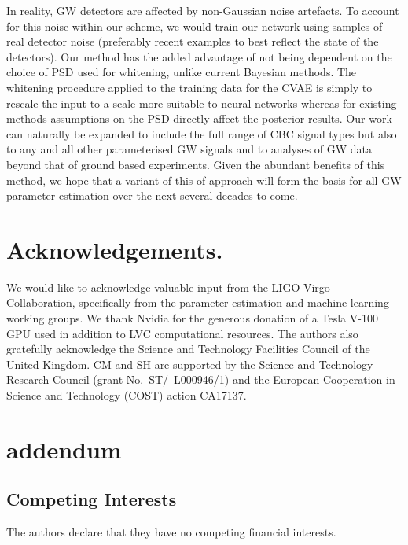 \documentclass[%
showpacs,
 amsmath,amssymb,
 aps,
 twocolumn,
 prl,
 reprint,
floatfix,
]{revtex4-1}
\begin{document}
%
%
In reality, \ac{GW} detectors are affected by non-Gaussian noise artefacts. To
account for this noise within our scheme, we would train our network using
samples of real detector noise (preferably recent examples to best reflect the
state of the detectors). Our method has the added advantage of not being
dependent on the choice of \ac{PSD} used for whitening, unlike current Bayesian
methods. The whitening procedure applied to the training data for the \ac{CVAE}
is simply to rescale the input to a scale more suitable to neural networks
whereas for existing methods assumptions on the \ac{PSD} directly affect the
posterior results. Our work can naturally be expanded to include the full range
of \ac{CBC} signal types but also to any and all other parameterised \ac{GW}
signals and to analyses of \ac{GW} data beyond that of ground based
experiments. Given the abundant benefits of this method, we hope that a variant
of this of approach will form the basis for all \ac{GW} parameter estimation
over the next several decades to come.
%
%

%
%
\section{Acknowledgements.}
%
We would like to acknowledge valuable input from the LIGO-Virgo Collaboration,
specifically from the parameter estimation and machine-learning working groups.
We thank Nvidia for the generous donation of a Tesla V-100 GPU used in addition
to \ac{LVC} computational resources. The authors also gratefully
acknowledge the Science and Technology Facilities Council of the United
Kingdom. CM and SH are supported by the Science and Technology Research Council
(grant No.~ST/~L000946/1) and the European Cooperation in Science and
Technology (COST) action CA17137.
%
%



\section{addendum}
 \subsection{Competing Interests} 
    The authors declare that they have no competing financial interests.
\end{document}
